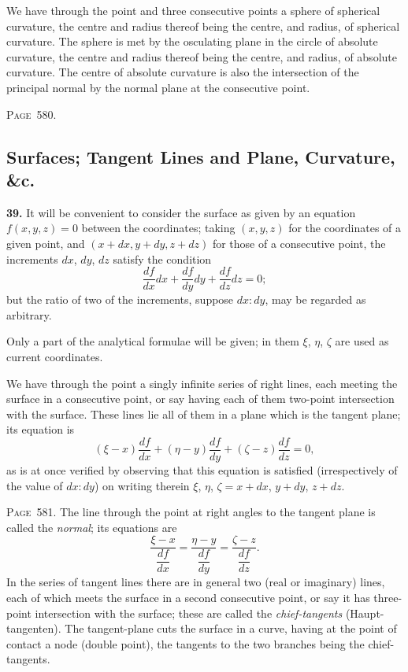\documentclass[11pt,a4paper]{article}
\theoremstyle{definition}
\begin{document}
We have through the point and three consecutive points a sphere of spherical curvature, the centre and radius thereof being the centre, and radius, of spherical curvature. The sphere is met by the osculating plane in the circle of absolute curvature, the centre and radius thereof being the centre, and radius, of absolute curvature. The centre of absolute curvature is also the intersection of the principal normal by the normal plane at the consecutive point.

\newpage
\noindent\textsc{Page~580.} \subsection*{Surfaces; Tangent Lines and Plane, Curvature, \&c.}

\textbf{39.} It will be convenient to consider the surface as given by an equation $f(x,y,z)=0$ between the coordinates; taking $(x,y,z)$ for the coordinates of a given point, and $(x+dx, y+dy, z+dz)$ for those of a consecutive point, the increments $dx$, $dy$, $dz$ satisfy the condition
\[
\frac{df}{dx}dx+\frac{df}{dy}dy+\frac{df}{dz}dz=0;
\]
but the ratio of two of the increments, suppose $dx:dy$, may be regarded as arbitrary.

Only a part of the analytical formulae will be given; in them $\xi$, $\eta$, $\zeta$ are used as current coordinates.

We have through the point a singly infinite series of right lines, each meeting the surface in a consecutive point, or say having each of them two-point intersection with the surface. These lines lie all of them in a plane which is the tangent plane; its equation is
\[
(\xi-x)\frac{df}{dx}+(\eta-y)\frac{df}{dy}+(\zeta-z)\frac{df}{dz}=0,
\]
as is at once verified by observing that this equation is satisfied (irrespectively of the value of $dx:dy$) on writing therein $\xi$, $\eta$, $\zeta=x+dx$, $y+dy$, $z+dz$.

\newpage
\noindent\textsc{Page~581.} The line through the point at right angles to the tangent plane is called the \textit{normal}; its equations are
\[
\frac{\xi-x}{\dfrac{df}{dx}}=\frac{\eta-y}{\dfrac{df}{dy}}=\frac{\zeta-z}{\dfrac{df}{dz}}.
\]
In the series of tangent lines there are in general two (real or imaginary) lines, each of which meets the surface in a second consecutive point, or say it has three-point intersection with the surface; these are called the \textit{chief-tangents} (Haupt-tangenten). The tangent-plane cuts the surface in a curve, having at the point of contact a node (double point), the tangents to the two branches being the chief-tangents.
\end{document}
